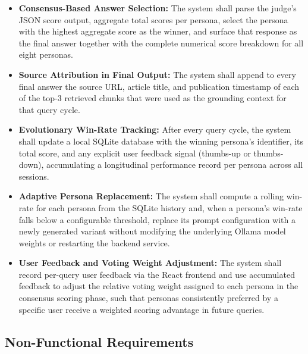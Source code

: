 \begin{itemize}
    \item \textbf{Consensus-Based Answer Selection:}
    The system shall parse the judge's JSON score output, aggregate total scores per
    persona, select the persona with the highest aggregate score as the winner, and
    surface that response as the final answer together with the complete numerical
    score breakdown for all eight personas.

    \item \textbf{Source Attribution in Final Output:}
    The system shall append to every final answer the source URL, article title, and
    publication timestamp of each of the top-3 retrieved chunks that were used as
    the grounding context for that query cycle.

    \item \textbf{Evolutionary Win-Rate Tracking:}
    After every query cycle, the system shall update a local SQLite database with
    the winning persona's identifier, its total score, and any explicit user feedback
    signal (thumbs-up or thumbs-down), accumulating a longitudinal performance record
    per persona across all sessions.

    \item \textbf{Adaptive Persona Replacement:}
    The system shall compute a rolling win-rate for each persona from the SQLite
    history and, when a persona's win-rate falls below a configurable threshold,
    replace its prompt configuration with a newly generated variant without modifying
    the underlying Ollama model weights or restarting the backend service.

    \item \textbf{User Feedback and Voting Weight Adjustment:}
    The system shall record per-query user feedback via the React frontend and use
    accumulated feedback to adjust the relative voting weight assigned to each persona
    in the consensus scoring phase, such that personas consistently preferred by a
    specific user receive a weighted scoring advantage in future queries.

\end{itemize}

\subsection{Non-Functional Requirements}

